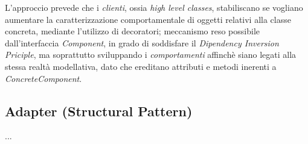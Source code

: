 \documentclass{article}
\begin{document}
L'approccio prevede che i \textit{clienti}, ossia \textit{high level classes}, stabiliscano se vogliano aumentare la caratterizzazione comportamentale di oggetti relativi alla classe concreta, mediante l'utilizzo di decoratori; meccanismo reso possibile  dall'interfaccia \textit{Component}, in grado di soddisfare il \textit{Dipendency Inversion Priciple}, ma soprattutto sviluppando i \textit{comportamenti} affinchè siano legati alla stessa realtà modellativa, dato che ereditano attributi e metodi inerenti a \textit{ConcreteComponent}.

\subsection*{Adapter (Structural Pattern)}
\large
...
\end{document}
